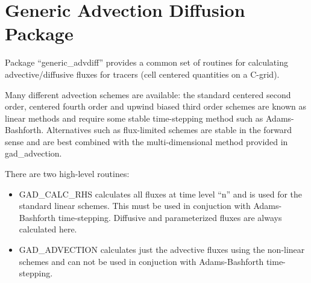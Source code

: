 
\chapter{Generic Advection Diffusion Package}
  
Package ``generic\_advdiff'' provides a common set of routines for
calculating advective/diffusive fluxes for tracers (cell centered
quantities on a C-grid).
  
Many different advection schemes are available: the standard centered
second order, centered fourth order and upwind biased third order
schemes are known as linear methods and require some stable
time-stepping method such as Adams-Bashforth. Alternatives such as
flux-limited schemes are stable in the forward sense and are best
combined with the multi-dimensional method provided in gad\_advection.
  
There are two high-level routines:
\begin{itemize}
\item{GAD\_CALC\_RHS} calculates all fluxes at time level ``n'' and is
  used for the standard linear schemes. This must be used in
  conjuction with Adams-Bashforth time-stepping. Diffusive and
  parameterized fluxes are always calculated here.
  
\item{GAD\_ADVECTION} calculates just the advective fluxes using the
  non-linear schemes and can not be used in conjuction with
  Adams-Bashforth time-stepping.
\end{itemize} 

